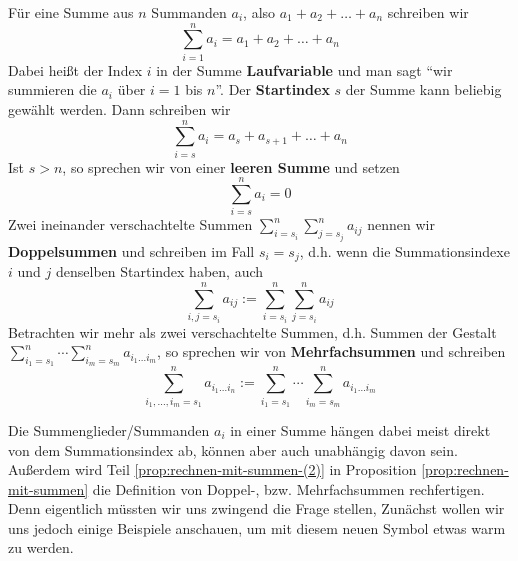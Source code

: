 \begin{definition}
    Für eine Summe aus \(n\) Summanden \(a_i\), also \(a_1 + a_2 + \dots + a_n\) schreiben wir 
    \begin{equation*}
        \sum_{i=1}^n a_i = a_1 + a_2 + \dots + a_n
    \end{equation*}
    Dabei heißt der Index \(i\) in der Summe \textbf{Laufvariable} und man sagt "`wir summieren die \(a_i\) über \(i=1\) bis \(n\)"'. Der \textbf{Startindex} \(s\) der Summe kann beliebig gewählt werden. Dann schreiben wir 
    \begin{equation*}
        \sum_{i=s}^n a_i = a_s + a_{s+1} + \dots + a_n
    \end{equation*}
    Ist \(s> n\), so sprechen wir von einer \textbf{leeren Summe} und setzen 
    \begin{equation*}
        \sum_{i=s}^n a_i = 0
    \end{equation*}
    Zwei ineinander verschachtelte Summen \(\sum_{i=s_i}^n \sum_{j=s_j}^n a_{ij}\) nennen wir \textbf{Doppelsummen} und schreiben im Fall \(s_i = s_j\), d.h. wenn die Summationsindexe \(i\) und \(j\) denselben Startindex haben, auch 
    \begin{equation*}
        \sum_{i,j=s_i}^n a_{ij} := \sum_{i=s_i}^n \sum_{j=s_i}^n a_{ij}
    \end{equation*}
    Betrachten wir mehr als zwei verschachtelte Summen, d.h. Summen der Gestalt \break \(\sum_{i_1=s_1}^n \cdots \sum_{i_m=s_m}^n a_{i_1\dots i_m}\), so sprechen wir von \textbf{Mehrfachsummen} und schreiben
    \begin{equation*}
        \sum_{i_1, \dots, i_m=s_1}^n a_{i_1 \dots i_n} := \sum_{i_1=s_1}^n \cdots \sum_{i_m=s_m}^n a_{i_1\dots i_m}
    \end{equation*}
\end{definition}
Die Summenglieder/Summanden \(a_i\) in einer Summe hängen dabei meist direkt von dem Summationsindex ab, können aber auch unabhängig davon sein. Außerdem wird Teil \ref{prop:rechnen-mit-summen-(2)} in Proposition \ref{prop:rechnen-mit-summen} die Definition von Doppel-, bzw. Mehrfachsummen rechfertigen. Denn eigentlich müssten wir uns zwingend die Frage stellen,   Zunächst wollen wir uns jedoch einige Beispiele anschauen, um mit diesem neuen Symbol etwas warm zu werden. 


